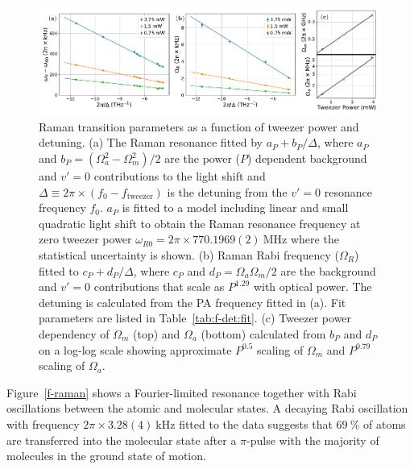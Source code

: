 \documentclass[aps,prl,twocolumn,10pt,superscriptaddress]{revtex4-1}
\newcommand{\paren}[1]{{\left({#1}\right)}}
\newcommand{\todo}[1]{}
\begin{document}
\begin{figure}[t!]
  \includegraphics[width=\textwidth]{imgs/fig-det.pdf}
  \caption{Raman transition parameters as a function of tweezer power and detuning.
    (a) The Raman resonance fitted by $a_P+b_P/\Delta$, where
    $a_P$ and $b_P=(\Omega_a^2-\Omega_m^2)/2$
    are the power ($P$) dependent background and $v'=0$ contributions
    to the light shift and
    $\Delta\equiv2\pi\times\paren{f_0 - f_{\mathrm{tweezer}}}$ is the detuning from
    the $v'=0$ resonance frequency $f_0$.
    $a_P$ is fitted to a model including linear and small quadratic light shift
    \todo{which assumes $\Omega_m\gg\Omega_a$} to obtain the Raman resonance frequency
    at zero tweezer power $\omega_{R0}=2\pi\times770.1969(2)~\mathrm{MHz}$ where the statistical uncertainty is shown.
    (b) Raman Rabi frequency ($\Omega_R$) fitted to $c_P+d_P/\Delta$, where
    $c_P$ and $d_P=\Omega_a\Omega_m/2$
    are the background and $v'=0$ contributions that scale as $P^{1.29}$ with optical power.
    The detuning is calculated from the PA frequency fitted in (a). Fit parameters are listed in Table~\ref{tab:f-det:fit}.
    (c) Tweezer power dependency of $\Omega_m$ (top) and $\Omega_a$ (bottom) calculated from
    $b_P$ and $d_P$ on a log-log scale showing approximate $P^{0.5}$ scaling of $\Omega_m$ and
    $P^{0.79}$ scaling of $\Omega_a$. 
    \label{f-det}}
\end{figure}

Figure~\ref{f-raman} shows a Fourier-limited resonance together with Rabi oscillations between the atomic and molecular states.
A decaying Rabi oscillation with frequency $2\pi\times3.28(4)~\mathrm{kHz}$ fitted to the data suggests that
$69~\mathrm{\%}$ of atoms are transferred into the molecular state after a $\pi$-pulse with the majority of molecules in the ground state of motion. 
\end{document}
